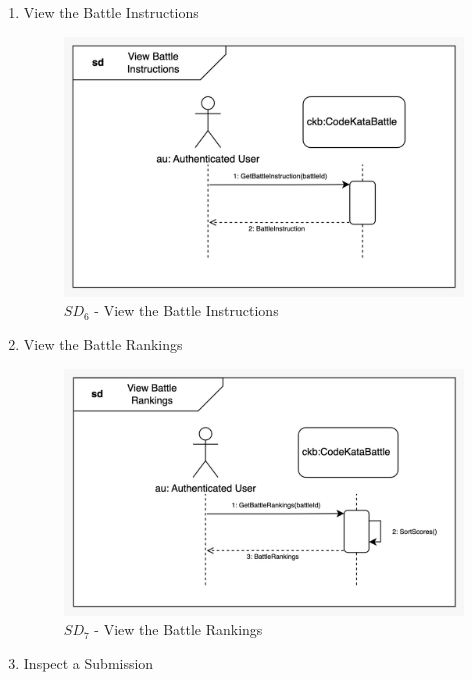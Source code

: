 \begin{enumerate}
\begin{figure}[H]
    \end{figure}
    \item View the Battle Instructions
    \begin{figure}[H]
        \centering
        \includegraphics[scale=0.2]{Images/sequence_diagrams/SD-view_battle_instructions.jpeg}
        \caption{$SD_{6}$ - View the Battle Instructions}
    \end{figure}
    \newpage
    \item View the Battle Rankings
    \begin{figure}[H]
        \centering
        \includegraphics[scale=0.2]{Images/sequence_diagrams/SD-view_battle_rankings.jpeg}
        \caption{$SD_{7}$ - View the Battle Rankings}
    \end{figure}
    \item Inspect a Submission
    \begin{figure}[H]
        \centering

\end{figure}
\end{enumerate}
